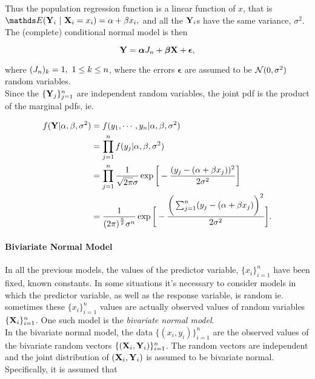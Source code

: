 \documentclass{homework}
\begin{document}
Thus the population regression function is a linear function of $x$, that is $\E ({\bf Y}_i\blank|\blank{\bf X}_i = x_i) = \alpha + \beta x_i, $ and all the ${\bf Y}_i$s have the same variance, $\sigma^2$. The (complete) conditional normal model is then

\begin{equation}
    {\bf Y} = \bm \alpha J_n + \bm \beta {\bf X} + \bm \epsilon,
\end{equation}

where $(J_n)_k = 1, \textnormal{ } 1 \leq k \leq n$, where the errors ${\bm \epsilon}$ are assumed to be $\mathcal{N}(0,\sigma^2)$ random variables. \\

Since the $\{{\bf Y}_j\}_{j=1}^{n}$ are independent random variables, the joint pdf is the product of the marginal pdfs, ie.

\begin{align*}
    f({\bf Y} | \alpha, \beta, \sigma^2) &= f(y_1, \cdots, y_n | \alpha, \beta, \sigma^2) \\
    &= \prod_{j=1}^{n} f(y_j | \alpha, \beta, \sigma^2) \\
    &= \prod_{j=1}^{n} \frac{1}{\sqrt{2\pi}\sigma} \exp\bigg[-\frac{(y_j -(\alpha + \beta x_j))^2}{2\sigma^2}\bigg] \\
    &=  \frac{1}{{(2\pi)}^{\frac{n}{2}}\sigma^{n}} \exp\bigg[-\frac{\bigg(\sum_{j=1}^{n}(y_j -(\alpha + \beta x_j)\bigg)^2}{2\sigma^2}\bigg]. \\
\end{align*}

\paragraph{\textbf{Biviariate Normal Model}} 

In all the previous models, the values of the predictor variable, $\{x_i\}_{i=1}^n$ have been fixed, known constants. In some situations it's necessary to consider models in which the predictor variable, as well as the response variable, is random ie. sometimes these $\{x_i\}_{i=1}^n$ values are actually observed values of random variables $\{{\bf X}_i\}_{i=1}^n$. One such model is the \textit{bivariate normal model}. \\

In the bivariate normal model, the data $\{(x_i, y_i)\}_{i=1}^n$ are the observed values of the bivariate random vectors $\{({\bf X}_i, {\bf Y}_i)\}_{i=1}^n$. The random vectors are independent and the joint distribution of $({\bf X}_i, {\bf Y}_i)$ is assumed to be bivariate normal. Specifically, it is assumed that 
\end{document}

